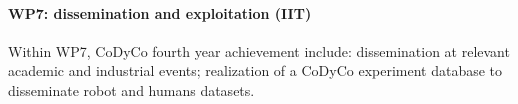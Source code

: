 

\paragraph*{WP7: dissemination and exploitation (IIT)}

Within WP7, CoDyCo fourth year achievement include: dissemination at relevant academic and industrial events; realization of a CoDyCo experiment database to disseminate robot and humans datasets. 

\newpage 

